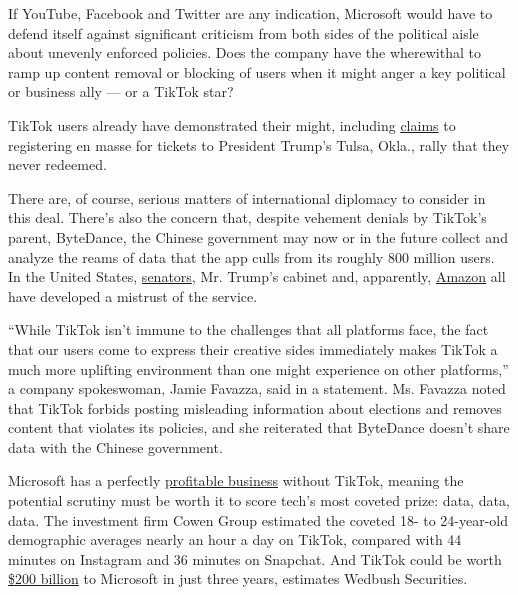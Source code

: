 If YouTube, Facebook and Twitter are any indication, Microsoft would
have to defend itself against significant criticism from both sides of
the political aisle about unevenly enforced policies. Does the company
have the wherewithal to ramp up content removal or blocking of users
when it might anger a key political or business ally --- or a TikTok
star?

TikTok users already have demonstrated their might, including
\href{https://www.nytimes.com/2020/06/21/style/tiktok-trump-rally-tulsa.html}{claims}
to registering en masse for tickets to President Trump's Tulsa, Okla.,
rally that they never redeemed.

There are, of course, serious matters of international diplomacy to
consider in this deal. There's also the concern that, despite vehement
denials by TikTok's parent, ByteDance, the Chinese government may now or
in the future collect and analyze the reams of data that the app culls
from its roughly 800 million users. In the United States,
\href{https://www.nytimes.com/reuters/2020/07/22/technology/22reuters-usa-tiktok-vote.html}{senators},
Mr. Trump's cabinet and, apparently,
\href{https://www.nytimes.com/2020/07/10/technology/tiktok-amazon-security-risk.html}{Amazon}
all have developed a mistrust of the service.

``While TikTok isn't immune to the challenges that all platforms face,
the fact that our users come to express their creative sides immediately
makes TikTok a much more uplifting environment than one might experience
on other platforms,'' a company spokeswoman, Jamie Favazza, said in a
statement. Ms. Favazza noted that TikTok forbids posting misleading
information about elections and removes content that violates its
policies, and she reiterated that ByteDance doesn't share data with the
Chinese government.

Microsoft has a perfectly
\href{https://www.wsj.com/articles/microsoft-revenue-surges-thoughazure-cloud-growth-slows-11595449687}{profitable
business} without TikTok, meaning the potential scrutiny must be worth
it to score tech's most coveted prize: data, data, data. The investment
firm Cowen Group estimated the coveted 18- to 24-year-old demographic
averages nearly an hour a day on TikTok, compared with 44 minutes on
Instagram and 36 minutes on Snapchat. And TikTok could be worth
\href{https://markets.businessinsider.com/news/stocks/microsoft-tiktok-stock-add-value-billion-deal-wall-street-analyst-2020-8-1029463140\#}{\$200
billion} to Microsoft in just three years, estimates Wedbush Securities.

